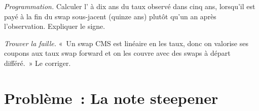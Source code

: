 \begin{exercise}[$\star\star\star$]\label{exo:rc:convexity-adjustments-and-constant-maturity-products:7}
\emph{Programmation.} Calculer l' à dix ans du taux observé dans cinq
ans, lorsqu'il est payé à la fin du swap sous-jacent (quinze ans) plutôt
qu'un an après l'observation. Expliquer le signe.
\end{exercise}

\begin{exercise}[$\star\star\star$]\label{exo:rc:convexity-adjustments-and-constant-maturity-products:8}
\emph{Trouver la faille.} «~Un swap CMS est linéaire en les taux, donc on valorise ses coupons aux
taux swap forward et on les couvre avec des swaps à départ différé.~» Le corriger.
\end{exercise}

\section{Problème~: La note steepener}


